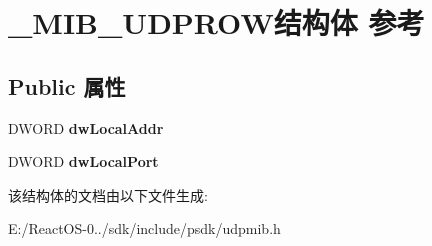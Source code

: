 \hypertarget{struct___m_i_b___u_d_p_r_o_w}{}\section{\+\_\+\+M\+I\+B\+\_\+\+U\+D\+P\+R\+O\+W结构体 参考}
\label{struct___m_i_b___u_d_p_r_o_w}
\subsection*{Public 属性}
\begin{DoxyCompactItemize}
\item 
\mbox{\label{struct___m_i_b___u_d_p_r_o_w_a3c7185c4c5a3a104a8a8b39ab79ddebc}} 
D\+W\+O\+RD {\bfseries dw\+Local\+Addr}
\item 
\mbox{\label{struct___m_i_b___u_d_p_r_o_w_a6100a6bcc3434098ce2f6f97fa5b4c87}} 
D\+W\+O\+RD {\bfseries dw\+Local\+Port}
\end{DoxyCompactItemize}


该结构体的文档由以下文件生成\+:\begin{DoxyCompactItemize}
\item 
E\+:/\+React\+O\+S-\/0../sdk/include/psdk/udpmib.\+h\end{DoxyCompactItemize}

